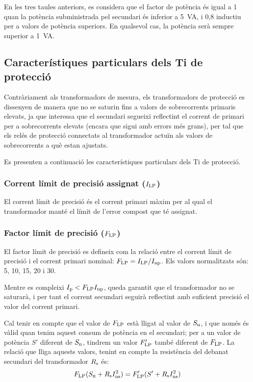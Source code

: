En les tres taules anteriors, es considera que el factor de
potència és igual a 1 quan la potència subministrada pel secundari és inferior a \SI{5}{VA}, i 0,8 inductiu per a valors de potència superiors. En qualsevol cas, la potència serà sempre superior a \SI{1}{VA}.


\subsection{Característiques particulars dels Ti de protecció}

Contràriament als transformadors de mesura, els transformadors de
protecció es dissenyen de manera que no se saturin fins a  valors
de sobrecorrents primaris elevats, ja que interessa que el
secundari segueixi reflectint el corrent de primari per a
 sobrecorrents elevats (encara que sigui amb errors més grans), per
tal que els relés de protecció connectats al transformador actuïn
als valors de sobrecorrents a què estan ajustats.

Es presenten a continuació les característiques particulars dels Ti
de protecció.

\subsubsection{Corrent límit de precisió assignat ($I_\mathrm{LP}$)}

El corrent
límit de precisió és el corrent primari màxim per al qual el transformador manté el límit
de l'error compost que té assignat.

\subsubsection{Factor límit de precisió ($F_\mathrm{LP}$) }

 El factor límit de precisió
es defineix com la relació entre el corrent límit de precisió
i el corrent primari nominal: $F_\mathrm{LP} = I_\mathrm{LP} /I_\mathrm{np}$.
Els valors normalitzats són: 5, 10, 15, 20 i 30.

Mentre es compleixi  $I_\mathrm{p}<F_\mathrm{LP} I_\mathrm{np}$, queda garantit
que el transformador no se saturarà, i per tant el corrent
secundari seguirà reflectint amb suficient precisió el valor del
corrent primari.

Cal tenir en compte que el valor de $F_\mathrm{LP}$ està lligat
 al valor de $S_\mathrm{n}$, i que només és vàlid
quan tenim aquest consum de  potència en el secundari; per a un
valor de potència $S'$ diferent de $S_\mathrm{n}$, tindrem un valor
$F'_\mathrm{LP}$ també diferent de  $F_\mathrm{LP}$. La relació que
lliga aquests valors, tenint en compte la resistència del debanat
secundari del transformador  $R_\mathrm{s}$ és:
\begin{equation}\label{eq:flp}
    F_\mathrm{LP} (S_\mathrm{n}+R_\mathrm{s}I_\mathrm{ns}^2) =
    F'_\mathrm{LP} (S'+R_\mathrm{s}I_\mathrm{ns}^2)
\end{equation}

